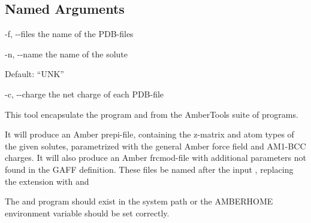 \documentclass[letterpaper,10pt,english]{sphinxmanual}
\begin{document}
\subsection{Named Arguments}
\label{\detokenize{tools:Named Arguments}}\begin{optionlist}{3cm}
\item [-f, -{-}files]  
the name of the PDB-files
\item [-n, -{-}name]  
the name of the solute

Default: “UNK”
\item [-c, -{-}charge]  
the net charge of each PDB-file
\end{optionlist}


%
\begin{sphinxVerbatim}[commandchars=\\\{\}]
  
    
    
      
\end{sphinxVerbatim}


This tool encapsulate the program  and  from the AmberTools suite of programs.

It will produce an Amber prepi-file, containing the z-matrix and atom types of the given solutes, parametrized with the general Amber force field and AM1-BCC charges. It will also produce an Amber frcmod-file with additional parameters not found in the GAFF definition. These files be named after the input , replacing the extension  with  and 

The  and  program should exist in the system path or the AMBERHOME environment variable should be set correctly.
\end{document}

